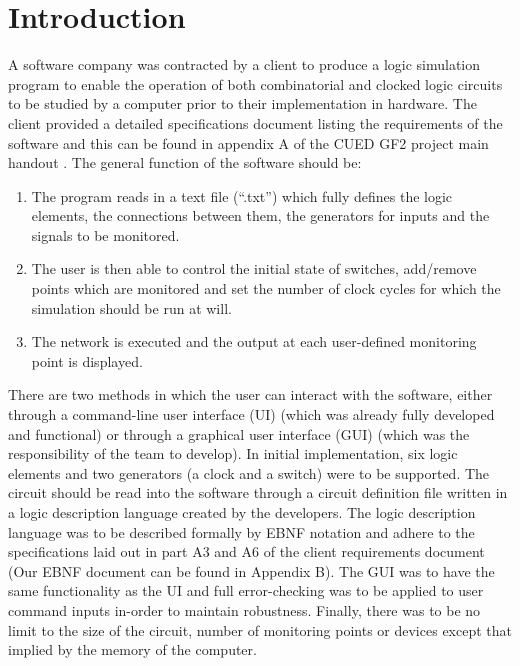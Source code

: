 \documentclass{article}					%
\begin{document}
\section{Introduction}
A software company was contracted by a client to produce a logic simulation program to enable the operation of both combinatorial and clocked logic circuits to be studied by a computer prior to their implementation in hardware. The client provided a detailed specifications document listing the requirements of the software and this can be found in appendix A of the CUED GF2 project main handout \cite{gee_agboola_2018}. The general function of the software should be:
\begin{enumerate}
	\item The program reads in a text file (“.txt”)  which fully defines the logic elements, the connections between them, the generators for inputs and the signals to be monitored.
	\item The user is then able to control the initial state of switches, add/remove points which are monitored and set the number of clock cycles for which the simulation should be run at will.
	\item The network is executed and the output at each user-defined monitoring point is displayed.
\end{enumerate}
There are two methods in which the user can interact with the software, either through a command-line user interface (UI) (which was already fully developed and functional) or through a graphical user interface (GUI) (which was the responsibility of the team to develop). In initial implementation, six logic elements and two generators (a clock and a switch) were to be supported. The circuit should be read into the software through a circuit definition file written in a logic description language created by the developers. The logic description language was to be described formally by EBNF notation and adhere to the specifications laid out in part A3 and A6 of the client requirements document (Our EBNF document can be found in Appendix B). The GUI was to have the same functionality as the UI and full error-checking was to be applied to user command inputs in-order to maintain robustness. Finally, there was to be no limit to the size of the circuit, number of monitoring points or devices except that implied by the memory of the computer.
\end{document}
